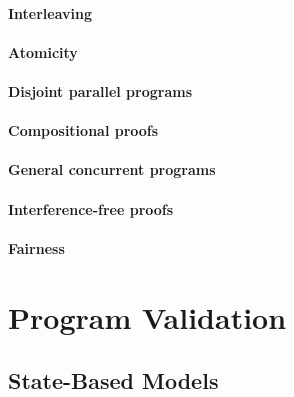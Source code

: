 \documentclass[12pt, a4paper]{book}
\begin{document}
  \subsubsection{Interleaving}
  \label{subs:Interleaving}
  \subsubsection{Atomicity}
  \label{subs:Atomicity}
  \subsubsection{Disjoint parallel programs}
  \label{subs:Disjoint parallel programs}
  \subsubsection{Compositional proofs}
  \label{subs:Compositional proofs}
  \subsubsection{General concurrent programs}
  \label{subs:General concurrent programs}
  \subsubsection{Interference-free proofs}
  \label{subs:Interference-free proofs}
  \subsubsection{Fairness}
  \label{subs:Fairness}



  \chapter{Program Validation}
  \label{chap:Program Validation}

  \section{State-Based Models}
  \label{sec:State-Based Models}
\end{document}
